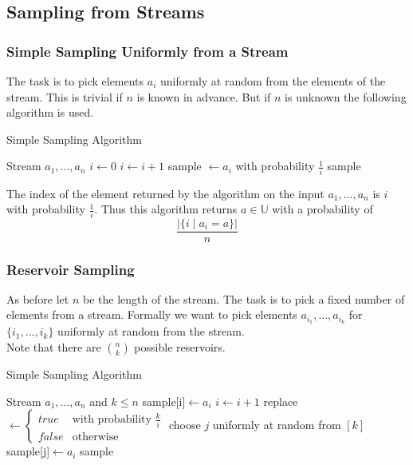 \documentclass{panikzettel}
\begin{document}
\subsection{Sampling from Streams}
\subsubsection{Simple Sampling Uniformly from a Stream}
The task is to pick elements $a_i$ uniformly at random from the elements of the stream. This is trivial if $n$ is known in advance. But if $n$ is unknown the following algorithm is used.

\begin{algo}{Simple Sampling Algorithm}
{
\renewcommand{\algorithmicrequire}{\textbf{Input:}}
\renewcommand{\algorithmicensure}{\textbf{Output:}}
  \begin{algorithmic}[1]
  \Require Stream $a_1,...,a_n$ 
  \State $i\leftarrow 0$
    \State $i\leftarrow i+1$
    \State sample $\leftarrow a_i$ with probability $\frac{1}{i}$ 
  \EndWhile
  \State \Return sample
  \end{algorithmic}
}
\end{algo}

The index of the element returned by the algorithm on the input $a_1,...,a_n$ is $i$ with probability $\frac{1}{i}$. Thus this algorithm returns $a\in\mathbb{U}$ with a probability of
\[
\frac{|\{i \mid a_i=a \}|}{n}
\]

\subsubsection{Reservoir Sampling}
As before let $n$ be the length of the stream. The task is to pick a fixed number of elements from a stream. Formally we want to pick elements $a_{i_1},...,a_{i_k}$ for $\{i_1,...,i_k\}$ uniformly at random from the stream.\\
Note that there are $\binom{n}{k}$ possible reservoirs.

\begin{algo}{Simple Sampling Algorithm}
{
\renewcommand{\algorithmicrequire}{\textbf{Input:}}
\renewcommand{\algorithmicensure}{\textbf{Output:}}
  \begin{algorithmic}[1]
  \Require Stream $a_1,...,a_n$ and $k\leq n$
  \State sample[i]$\leftarrow a_i$ 
  \EndFor
    \State $i\leftarrow i+1$
    \State replace $\leftarrow\begin{cases}
    true & \text{with probability } \frac{k}{i}\\
    false & \text{otherwise}
    \end{cases}$
    \State choose $j$ uniformly at random from $[k]$
    \State sample[j]$\leftarrow a_i$
    \EndIf
  \EndWhile
  \State \Return sample
  \end{algorithmic}
}
\end{algo}
\end{document}
